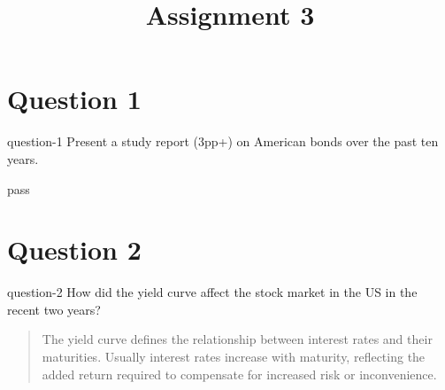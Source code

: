 \title{Assignment 3}


\section{Question 1}
\begin{statebox}{}{question-1}
    Present a study report (3pp+) on American bonds over the past ten years.
\end{statebox}
pass



\section{Question 2}
\begin{statebox}{}{question-2}
    How did the yield curve affect the stock market in the US in the recent two years?
\end{statebox}

\begin{quotation}
    The yield curve defines the relationship between interest rates and their maturities. Usually interest rates increase with maturity, reflecting the added return required to compensate for increased risk or inconvenience. 
\end{quotation}



% 

